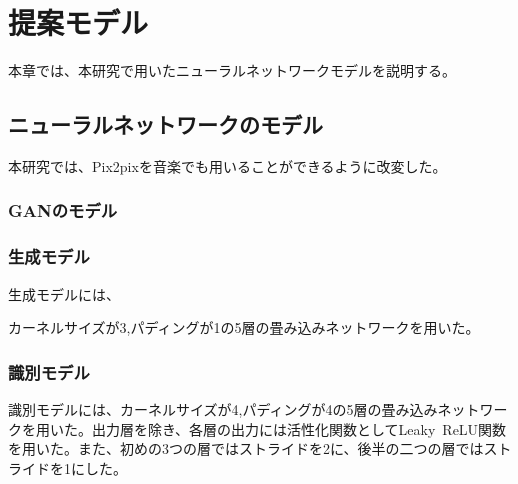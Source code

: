 \chapter{提案モデル}
\label{chap:pr_model}

本章では、本研究で用いたニューラルネットワークモデルを説明する。

\section{ニューラルネットワークのモデル}

本研究では、Pix2pixを音楽でも用いることができるように改変した。

\subsection{GANのモデル}


\subsection{生成モデル}

生成モデルには、

カーネルサイズが3,パディングが1の5層の畳み込みネットワークを用いた。

\subsection{識別モデル}

識別モデルには、カーネルサイズが4,パディングが4の5層の畳み込みネットワークを用いた。出力層を除き、各層の出力には活性化関数としてLeaky~ReLU関数を用いた。また、初めの3つの層ではストライドを2に、後半の二つの層ではストライドを1にした。